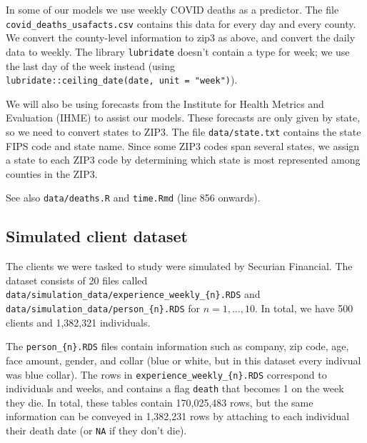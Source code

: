 \documentclass[
]{article}
\begin{document}
In some of our models we use weekly COVID deaths as a predictor. The
file \texttt{covid\_deaths\_usafacts.csv} contains this data for every
day and every county. We convert the county-level information to zip3 as
above, and convert the daily data to weekly. The library
\texttt{lubridate} doesn't contain a type for week; we use the last day
of the week instead (using
\texttt{lubridate::ceiling\_date(date,\ unit\ =\ "week")}).

We will also be using forecasts from the Institute for Health Metrics
and Evaluation (IHME) to assist our models. These forecasts are only
given by state, so we need to convert states to ZIP3. The file
\texttt{data/state.txt} contains the state FIPS code and state name.
Since some ZIP3 codes span several states, we assign a state to each
ZIP3 code by determining which state is most represented among counties
in the ZIP3.

See also \texttt{data/deaths.R} and \texttt{time.Rmd} (line 856
onwards).

\hypertarget{simulated-client-dataset}{%
\subsection{Simulated client dataset}\label{simulated-client-dataset}}

The clients we were tasked to study were simulated by Securian
Financial. The dataset consists of 20 files called
\texttt{data/simulation\_data/experience\_weekly\_\{n\}.RDS} and
\texttt{data/simulation\_data/person\_\{n\}.RDS} for
\(n = 1,\dotsc, 10\). In total, we have 500 clients and 1,382,321
individuals.

The \texttt{person\_\{n\}.RDS} files contain information such as
company, zip code, age, face amount, gender, and collar (blue or white,
but in this dataset every indivual was blue collar). The rows in
\texttt{experience\_weekly\_\{n\}.RDS} correspond to individuals and
weeks, and contains a flag \texttt{death} that becomes 1 on the week
they die. In total, these tables contain 170,025,483 rows, but the same
information can be conveyed in 1,382,231 rows by attaching to each
individual their death date (or \texttt{NA} if they don't die).
\end{document}
